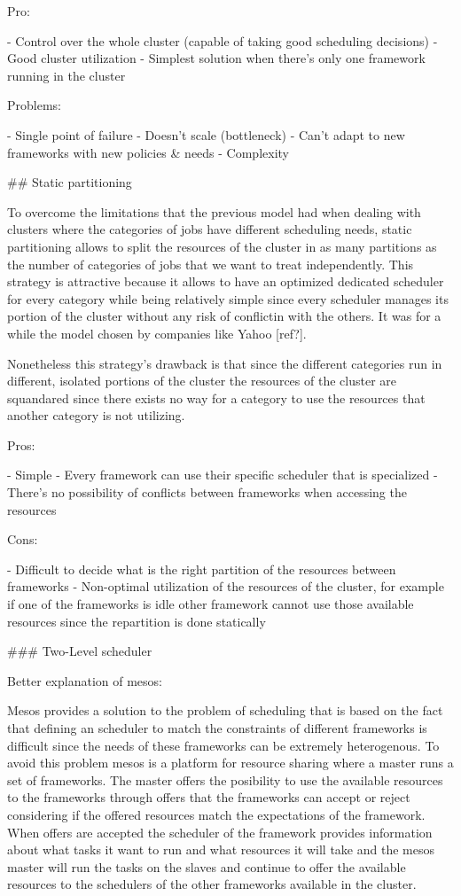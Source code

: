 Pro:

- Control over the whole cluster (capable of taking good scheduling decisions)
- Good cluster utilization
- Simplest solution when there's only one framework running in the cluster

Problems:

- Single point of failure
- Doesn't scale (bottleneck)
- Can't adapt to new frameworks with new policies & needs
- Complexity

## Static partitioning

To overcome the limitations that the previous model had when dealing
with clusters where the categories of jobs have different scheduling
needs, static partitioning allows to split the resources of the cluster
in as many partitions as the number of categories of jobs that we want to
treat independently. This strategy is attractive because it allows to
have an optimized dedicated scheduler for every category while being
relatively simple since every scheduler manages its portion of the
cluster without any risk of conflictin with the others. It was
for a while the model chosen by companies like Yahoo [ref?].

Nonetheless this strategy's drawback is that since the different 
categories run in different, isolated portions of the cluster the
resources of the cluster are squandared since there exists no way for
a category to use the resources that another category is not utilizing.

Pros:

- Simple
- Every framework can use their specific scheduler that is specialized
- There's no possibility of conflicts between frameworks when
  accessing the resources

Cons:

- Difficult to decide what is the right partition of the resources
between frameworks
- Non-optimal utilization of the resources of the cluster, for example
if one of the frameworks is idle other framework cannot use those
available resources since the repartition is done statically

### Two-Level scheduler

Better explanation of mesos:

Mesos provides a solution to the problem of scheduling that is based
on the fact that defining an scheduler to match the constraints of different
frameworks is difficult since the needs of these frameworks can be
extremely heterogenous. To avoid this problem mesos is a platform for
resource sharing where a master runs a set of frameworks. The master
offers the posibility to use the available resources to the frameworks
through offers that the frameworks can accept or reject considering if
the offered resources match the expectations of the framework. When
offers are accepted the scheduler of the framework provides
information about what tasks it want to run and what resources it will
take and the mesos master will run the tasks on the slaves and
continue to offer the available resources to the schedulers of the
other frameworks available in the cluster.

